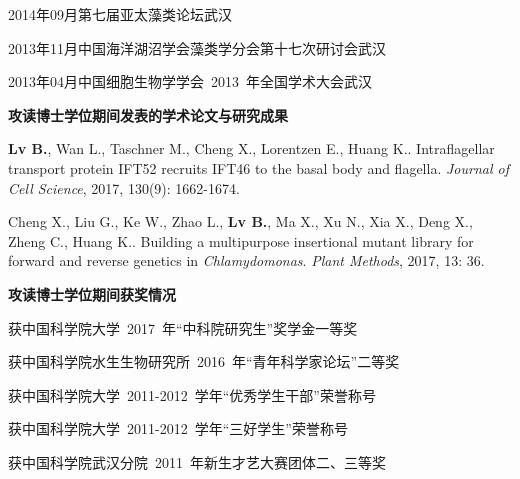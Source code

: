\begin{asparaitem}[\CircleSolid]
\begin{asparaitem}[\hspace{4em} \SixFlowerRemovedOpenPetal]
    \item 2014年09月\quad 第七届亚太藻类论坛\hfill 武汉
    \item 2013年11月\quad 中国海洋湖沼学会藻类学分会第十七次研讨会\hfill 武汉
    \item 2013年04月\quad 中国细胞生物学学会\ 2013\ 年全国学术大会\hfill 武汉
    \end{asparaitem}
\vspace{1em}
\item \textbf{攻读博士学位期间发表的学术论文与研究成果}
    \begin{compactitem}[\hspace{4em} \SixFlowerRemovedOpenPetal]
    \normalsize
    \item \textbf{Lv B.}, Wan L., Taschner M., Cheng X., Lorentzen E., Huang K.. Intraflagellar transport protein IFT52 recruits IFT46 to the basal body and flagella. \textit{Journal of Cell Science}, 2017, 130(9): 1662-1674.
    \item Cheng X., Liu G., Ke W., Zhao L., \textbf{Lv B.}, Ma X., Xu N., Xia X., Deng X., Zheng C., Huang K.. Building a multipurpose insertional mutant library for forward and reverse genetics in \textit{Chlamydomonas}. \textit{Plant Methods}, 2017, 13: 36.
    \end{compactitem}
\vspace{1em}
\item \textbf{攻读博士学位期间获奖情况}
    \begin{asparaitem}[\hspace{4em} \SixFlowerRemovedOpenPetal]
    \normalsize
    \item 获中国科学院大学\ 2017\ 年“中科院研究生”奖学金一等奖
    \item 获中国科学院水生生物研究所\ 2016\ 年“青年科学家论坛”二等奖
    \item 获中国科学院大学\ 2011-2012\ 学年“优秀学生干部”荣誉称号
    \item 获中国科学院大学\ 2011-2012\ 学年“三好学生”荣誉称号
    \item 获中国科学院武汉分院\ 2011\ 年新生才艺大赛团体二、三等奖
    \end{asparaitem}
\end{asparaitem}



